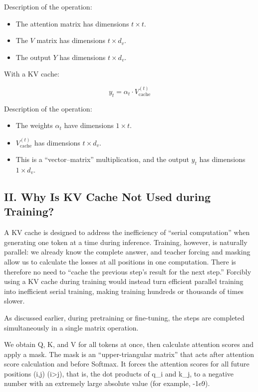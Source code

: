 Description of the operation:

\begin{itemize}
\tightlist
\item
  The attention matrix has dimensions \(t \times t\).
\item
  The \(V\) matrix has dimensions \(t \times d_v\).
\item
  The output \(Y\) has dimensions \(t \times d_v\).
\end{itemize}

With a KV cache:

\[
y_t = \alpha_t \cdot V_{\mathrm{cache}}^{(t)}
\]

Description of the operation:

\begin{itemize}
\tightlist
\item
  The weights \(\alpha_t\) have dimensions \(1 \times t\).
\item
  \(V_{\mathrm{cache}}^{(t)}\) has dimensions \(t \times d_v\).
\item
  This is a ``vector--matrix'' multiplication, and the output \(y_t\) has dimensions \(1 \times d_v\).
\end{itemize}

\hypertarget{ii.-why-is-kv-cache-not-used-during-training}{%
\subsection{II. Why Is KV Cache Not Used during Training?}\label{ii.-why-is-kv-cache-not-used-during-training}}

A KV cache is designed to address the inefficiency of ``serial computation'' when generating one token at a time during inference. Training, however, is naturally parallel: we already know the complete answer, and teacher forcing and masking allow us to calculate the losses at all positions in one computation. There is therefore no need to ``cache the previous step's result for the next step.'' Forcibly using a KV cache during training would instead turn efficient parallel training into inefficient serial training, making training hundreds or thousands of times slower.

As discussed earlier, during pretraining or fine-tuning, the steps are completed simultaneously in a single matrix operation.

We obtain Q, K, and V for all tokens at once, then calculate attention scores and apply a mask. The mask is an ``upper-triangular matrix'' that acts after attention score calculation and before Softmax. It forces the attention scores for all future positions (i,j) (i\textgreater j), that is, the dot products of q\_i and k\_j, to a negative number with an extremely large absolute value (for example, -1e9).

